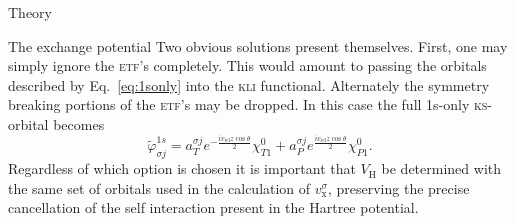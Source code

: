 \documentclass[aps, pra, reprint, groupedaddress, amsfonts,
               amsmath, amssymb, showpacs, nofootinbib]{revtex4-1}
\begin{document}
\begin{section}{Theory \label{sec:theory}}
\begin{subsection}{The exchange potential \label{sec:xpot}}
      Two obvious solutions present themselves. First, one may simply ignore the \textsc{etf}'s
      completely. This would amount to passing the orbitals described by Eq.~\eqref{eq:1sonly} into
      the \textsc{kli} functional. Alternately the symmetry breaking portions of the \textsc{etf}'s
      may be dropped. In this case the full 1s-only \textsc{ks}-orbital becomes
      \begin{equation} \label{eq:1sonlyetf}
         \tilde{\varphi}_{\sigma j}^{1s} =
                       a^{\sigma j}_T e^{- \frac{i v_\mathrm{rel} z \cos \theta}{2}} \chi^{0}_{T1}
                     + a^{\sigma j}_P  e^{\frac{i v_\mathrm{rel} z \cos \theta}{2}}\chi^{0}_{P1}.
      \end{equation}
      Regardless of which option is chosen it is important that $V_\mathrm{H}$ be determined with the
      same set of orbitals used in the calculation of $v_\mathrm{x}^\sigma$, preserving the precise
      cancellation of the self interaction present in the Hartree potential.

   \end{subsection}

\end{section}
\end{document}
